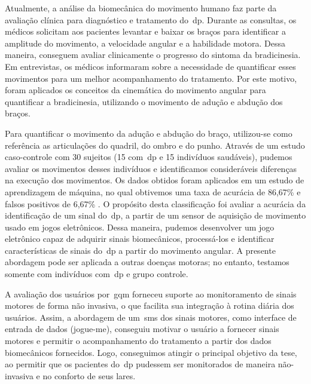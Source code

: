 Atualmente, a análise da biomecânica do movimento humano faz parte da avaliação clínica para diagnóstico e tratamento do~\ac{dp}. Durante as consultas, os médicos solicitam aos pacientes levantar e baixar os braços para identificar a amplitude do movimento, a velocidade angular e a habilidade motora. Dessa maneira, conseguem avaliar clinicamente o progresso do sintoma da bradicinesia. Em entrevistas, os médicos informaram sobre a necessidade de quantificar esses movimentos para um melhor acompanhamento do tratamento. Por este motivo, foram aplicados os conceitos da cinemática do movimento angular para quantificar a bradicinesia, utilizando o movimento de adução e abdução dos braços.

Para quantificar o movimento da adução e abdução do braço, utilizou-se como referência as articulações do quadril, do ombro e do punho. Através de um estudo caso-controle com 30 sujeitos (15 com~\ac{dp} e 15 indivíduos saudáveis), pudemos avaliar os movimentos desses indivíduos e identificamos consideráveis diferenças na execução dos movimentos. Os dados obtidos foram aplicados em um estudo de aprendizagem de máquina, no qual obtivemos uma taxa de acurácia de 86,67\% e falsos positivos de 6,67\% . O propósito desta classificação foi avaliar a acurácia da identificação de um sinal do~\ac{dp}, a partir de um sensor de aquisição de movimento usado em jogos eletrônicos. Dessa maneira, pudemos desenvolver um jogo eletrônico  capaz de adquirir sinais biomecânicos, processá-los e identificar características de sinais do~\ac{dp} a partir do movimento angular. A presente abordagem pode ser aplicada a outras doenças motoras; no entanto, testamos somente com indivíduos com~\ac{dp} e grupo controle.

A avaliação dos usuários por~\ac{gqm} forneceu suporte ao monitoramento de sinais motores de forma não invasiva, o que facilita sua integração à rotina diária dos usuários. Assim, a abordagem de um~\ac{sms} dos sinais motores, como interface de entrada de dados (\ac{jogue-me}), conseguiu motivar o usuário  a fornecer sinais motores e permitir o acompanhamento do tratamento a partir dos dados biomecânicos fornecidos. Logo, conseguimos atingir o principal objetivo da tese, ao permitir que os pacientes do~\ac{dp} pudessem ser monitorados de maneira não-invasiva e no conforto de seus lares.




